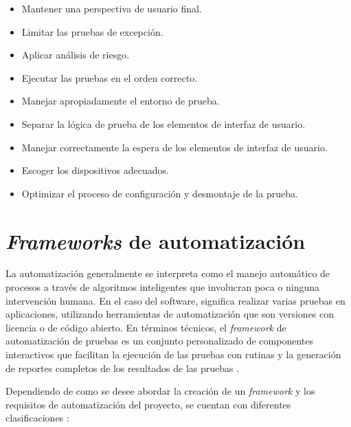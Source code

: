 \begin{itemize}
    \item Mantener una perspectiva de usuario final.
    \item Limitar las pruebas de excepción.
    \item Aplicar análisis de riesgo.
    \item Ejecutar las pruebas en el orden correcto.
    \item Manejar apropiadamente el entorno de prueba.
    \item Separar la lógica de prueba de los elementos de interfaz de usuario.
    \item Manejar correctamente la espera de los elementos de interfaz de
        usuario.
    \item Escoger los dispositivos adecuados.
    \item Optimizar el proceso de configuración y desmontaje de la prueba.
\end{itemize}

\section{\emph{Frameworks} de automatización}
La automatización generalmente se interpreta como el manejo automático de
procesos a través de algoritmos inteligentes que involucran poca o ninguna
intervención humana. En el caso del software, significa realizar varias pruebas
en aplicaciones, utilizando herramientas de automatización que son
versiones con licencia o de código abierto. En términos técnicos, el
\emph{framework} de automatización de pruebas es un conjunto personalizado de
componentes interactivos que facilitan la ejecución de las pruebas con rutinas y
la generación de reportes completos de los resultados de las pruebas
\cite{Techlabs}.

Dependiendo de como se desee abordar la creación de un \emph{framework} y los
requisitos de automatización del proyecto, se cuentan con diferentes
clasificaciones \cite{Nguyen}:

